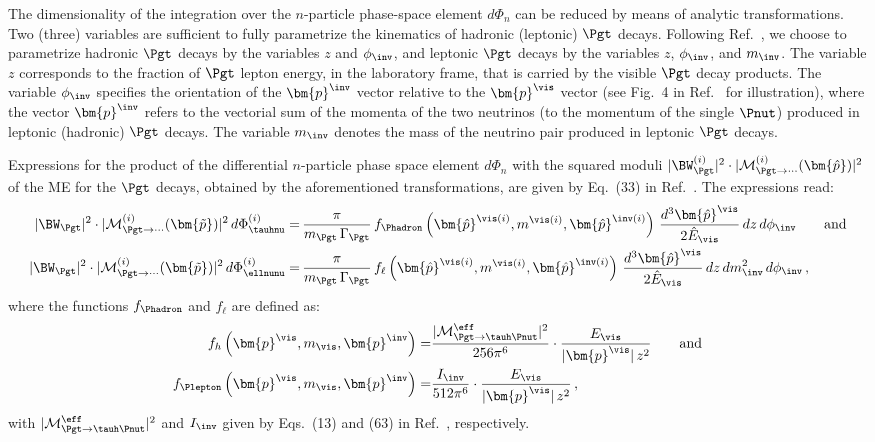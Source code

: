 The dimensionality of the integration over the $n$-particle phase-space element $d\Phi_{n}$ 
can be reduced by means of analytic transformations. 
Two (three) variables are sufficient to fully parametrize the kinematics of hadronic (leptonic) $\Pgt$ decays.
Following Ref.~\cite{SVfitMEM}, we choose to parametrize hadronic $\Pgt$ decays by the variables $z$ and $\phi_{\inv}$,
and leptonic $\Pgt$ decays by the variables $z$, $\phi_{\inv}$, and $m_{\inv}$.
The variable $z$ corresponds to the fraction of $\Pgt$ lepton energy, in the laboratory frame, that is carried by the visible $\Pgt$ decay products.
The variable $\phi_{\inv}$ specifies the orientation of the $\bm{p}^{\inv}$ vector relative to the $\bm{p}^{\vis}$ vector (see Fig.~4 in Ref.~\cite{SVfitMEM} for illustration),
where the vector $\bm{p}^{\inv}$ refers to the vectorial sum of the momenta of the two neutrinos (to the momentum of the single $\Pnut$) produced in leptonic (hadronic) $\Pgt$ decays.
The variable $m_{\inv}$ denotes the mass of the neutrino pair produced in leptonic $\Pgt$ decays.

Expressions for the product of the differential $n$-particle phase space element $d\Phi_{n}$ 
with the squared moduli $\vert \BW^{(i)}_{\Pgt} \vert^{2} \cdot \vert \mathcal{M}^{(i)}_{\Pgt\to\cdots}(\bm{\hat{p}}) \vert^{2}$ 
of the ME for the $\Pgt$ decays, 
obtained by the aforementioned transformations, are given by Eq.~(33) in Ref.~\cite{SVfitMEM}.
The expressions read:
\begin{align}
\vert \BW_{\Pgt} \vert^{2} \cdot \vert \mathcal{M}^{(i)}_{\Pgt\to\cdots}(\bm{\tilde{p}}) \vert^{2} \, d\Phi^{(i)}_{\tauhnu} 
 = & \, \frac{\pi}{m_{\Pgt} \, \Gamma_{\Pgt}} \,
 f_{\Phadron}\left(\bm{\hat{p}}^{\vis(i)}, m^{\vis(i)},
   \bm{\hat{p}}^{\inv(i)}\right) \, \frac{d^{3}\bm{\hat{p}}^{\vis}}{2 \hat{E}_{\vis}} \, dz \, d\phi_{\inv} \qquad \mbox{and} \nonumber \\
\vert \BW_{\Pgt} \vert^{2} \cdot \vert \mathcal{M}^{(i)}_{\Pgt\to\cdots}(\bm{\tilde{p}}) \vert^{2} \, d\Phi^{(i)}_{\ellnunu} 
 = & \, \frac{\pi}{m_{\Pgt} \, \Gamma_{\Pgt}} \, f_{\ell}\left(\bm{\hat{p}}^{\vis(i)},
 m^{\vis(i)}, \bm{\hat{p}}^{\inv(i)}\right) \, \frac{d^{3}\bm{\hat{p}}^{\vis}}{2 \hat{E}_{\vis}} \, dz \, dm^{2}_{\inv} \, d\phi_{\inv}
 \nonumber \, ,
\end{align}
where the functions $f_{\Phadron}$ and $f_{\ell}$ are defined as:
\begin{align}
f_{h}\left(\bm{p}^{\vis}, m_{\vis}, \bm{p}^{\inv}\right) = &
  \frac{\vert\mathcal{M}^{\eff}_{\Pgt \to \tauh\Pnut}\vert^{2}}{256\pi^{6}} \cdot \frac{E_{\vis}}{\vert\bm{p}^{\vis}\vert \, z^{2}} \qquad \mbox{and} \nonumber \\
f_{\Plepton}\left(\bm{p}^{\vis}, m_{\vis}, \bm{p}^{\inv}\right) = &
  \frac{I_{\inv}}{512\pi^{6}} \cdot \frac{E_{\vis}}{\vert\bm{p}^{\vis}\vert \, z^{2}} \nonumber \, , 
\end{align}
with $\vert\mathcal{M}^{\eff}_{\Pgt \to \tauh\Pnut}\vert^{2}$ and $I_{\inv}$ given by Eqs.~(13) and (63) in Ref.~\cite{SVfitMEM}, respectively.


